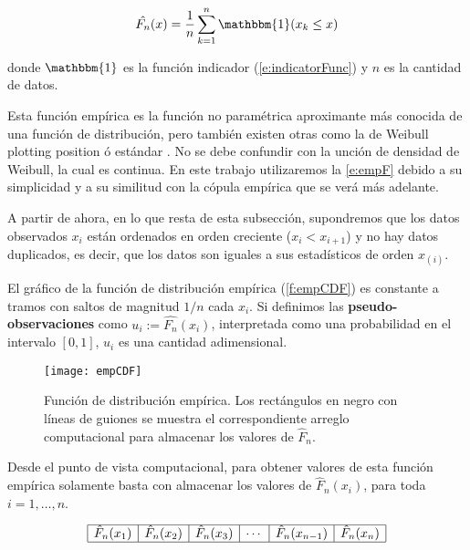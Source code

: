 \begin{equation}
\label{e:empF} %
\hat{F_n} (x) = \frac{1}{n}\sum_{k=1}^{n} \mathbbm{1} (x_k \le x)
\end{equation}

\noindent
donde $\mathbbm{1}$ es la funci\'on indicador (\autoref{e:indicatorFunc}) y $n$ es la cantidad de datos.

Esta funci\'on emp\'irica es la funci\'on no param\'etrica aproximante m\'as conocida de una funci\'on de distribuci\'on, pero tambi\'en existen otras como la de Weibull plotting position \'o est\'andar \citep[p. 10]{salvadori_extremes_2007}.
No se debe confundir con la unci\'on de densidad de Weibull, la cual es continua. En este trabajo utilizaremos la \autoref{e:empF} debido a su simplicidad y a su similitud con la c\'opula emp\'irica que se ver\'a m\'as adelante.

A partir de ahora, en lo que resta de esta subsecci\'on, supondremos que los datos observados $x_i$ est\'an ordenados en orden creciente ($x_i < x_{i+1}$) y no hay datos duplicados, es decir, que los datos son iguales a sus estad\'isticos de orden $x_{(i)}$.

El gr\'afico de la funci\'on de distribuci\'on emp\'irica (\autoref{f:empCDF}) es constante a tramos con saltos de magnitud $1/n$ cada $x_i$.
Si definimos las \textbf{pseudo-observaciones} como $u_i := \hat{F_n}(x_i)$,
interpretada como una probabilidad en el intervalo $[0,1]$, $u_i$ es una cantidad adimensional.

\begin{figure}[H]
	\centering
	\texttt{[image: empCDF]}
	\caption{Funci\'on de distribuci\'on emp\'irica. Los rect\'angulos en negro con l\'ineas de guiones se muestra el correspondiente arreglo computacional para almacenar los valores de $\hat{F}_n$.}
	\label{f:empCDF}
\end{figure}

Desde el punto de vista computacional, para obtener valores de esta funci\'on emp\'irica solamente basta con almacenar los valores de $\hat{F}_n(x_i)$, para toda $i=1,\ldots, n$.

$$
\begin{array}{| c | c | c | c | c | c |}
	\hline
	\hat{F}_n(x_1) & \hat{F}_n(x_2) & \hat{F}_n(x_3) & \cdots & \hat{F}_n(x_{n-1}) & \hat{F}_n(x_n) \\ \hline
\end{array}
$$

